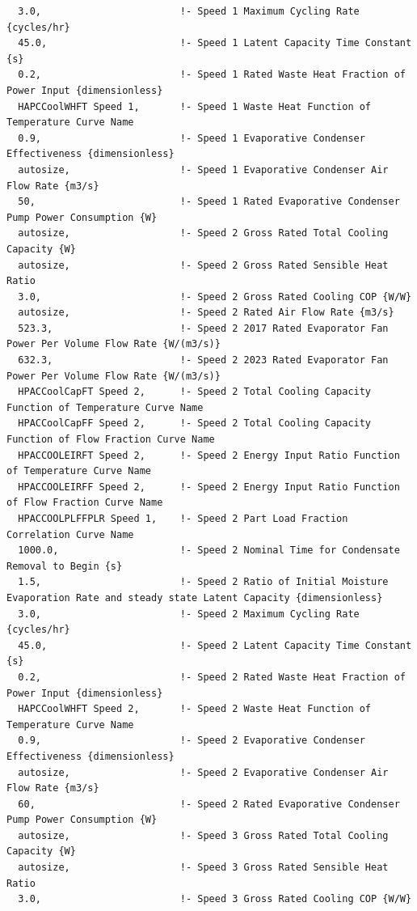 \begin{lstlisting}
  3.0,                        !- Speed 1 Maximum Cycling Rate {cycles/hr}
  45.0,                       !- Speed 1 Latent Capacity Time Constant {s}
  0.2,                        !- Speed 1 Rated Waste Heat Fraction of Power Input {dimensionless}
  HAPCCoolWHFT Speed 1,       !- Speed 1 Waste Heat Function of Temperature Curve Name
  0.9,                        !- Speed 1 Evaporative Condenser Effectiveness {dimensionless}
  autosize,                   !- Speed 1 Evaporative Condenser Air Flow Rate {m3/s}
  50,                         !- Speed 1 Rated Evaporative Condenser Pump Power Consumption {W}
  autosize,                   !- Speed 2 Gross Rated Total Cooling Capacity {W}
  autosize,                   !- Speed 2 Gross Rated Sensible Heat Ratio
  3.0,                        !- Speed 2 Gross Rated Cooling COP {W/W}
  autosize,                   !- Speed 2 Rated Air Flow Rate {m3/s}
  523.3,                      !- Speed 2 2017 Rated Evaporator Fan Power Per Volume Flow Rate {W/(m3/s)}
  632.3,                      !- Speed 2 2023 Rated Evaporator Fan Power Per Volume Flow Rate {W/(m3/s)}
  HPACCoolCapFT Speed 2,      !- Speed 2 Total Cooling Capacity Function of Temperature Curve Name
  HPACCoolCapFF Speed 2,      !- Speed 2 Total Cooling Capacity Function of Flow Fraction Curve Name
  HPACCOOLEIRFT Speed 2,      !- Speed 2 Energy Input Ratio Function of Temperature Curve Name
  HPACCOOLEIRFF Speed 2,      !- Speed 2 Energy Input Ratio Function of Flow Fraction Curve Name
  HPACCOOLPLFFPLR Speed 1,    !- Speed 2 Part Load Fraction Correlation Curve Name
  1000.0,                     !- Speed 2 Nominal Time for Condensate Removal to Begin {s}
  1.5,                        !- Speed 2 Ratio of Initial Moisture Evaporation Rate and steady state Latent Capacity {dimensionless}
  3.0,                        !- Speed 2 Maximum Cycling Rate {cycles/hr}
  45.0,                       !- Speed 2 Latent Capacity Time Constant {s}
  0.2,                        !- Speed 2 Rated Waste Heat Fraction of Power Input {dimensionless}
  HAPCCoolWHFT Speed 2,       !- Speed 2 Waste Heat Function of Temperature Curve Name
  0.9,                        !- Speed 2 Evaporative Condenser Effectiveness {dimensionless}
  autosize,                   !- Speed 2 Evaporative Condenser Air Flow Rate {m3/s}
  60,                         !- Speed 2 Rated Evaporative Condenser Pump Power Consumption {W}
  autosize,                   !- Speed 3 Gross Rated Total Cooling Capacity {W}
  autosize,                   !- Speed 3 Gross Rated Sensible Heat Ratio
  3.0,                        !- Speed 3 Gross Rated Cooling COP {W/W}

\end{lstlisting}
